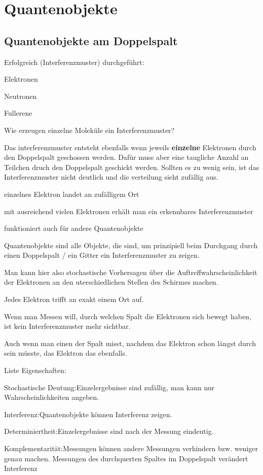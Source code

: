 \chapter{Quantenobjekte}


\section{Quantenobjekte am Doppelspalt}

Erfolgreich (Interferenzmuster) durchgeführt:

\startitemize[packed]
\item Elektronen
\item Neutronen
\item Fullerene
\stopitemize


\startframedtask
Wie erzeugen einzelne Moleküle ein Interferenzmuster?
\stopframedtask

Das interferenzmuster entsteht ebenfalls wenn jeweils {\bf einzelne} Elektronen
durch den Doppelspalt geschossen werden. Dafür muss aber eine taugliche Anzahl
an Teilchen druch den Doppelspalt geschickt werden. Sollten es zu wenig sein,
ist das Interferenzmuster nicht deutlich und die verteilung sieht zufällig aus.

\startitemize[packed]
\item einzelnes Elektron landet an zufälligem Ort
\item mit ausreichend vielen Elektronen erhält man ein erkennbares Interferenzmuster 
\item funktioniert auch für andere Quantenobjekte
\stopitemize

\startdefinition[title={Quantenobjekte}]

Quantenobjekte sind alle Objekte, die  sind, um
prinzipiell beim Durchgang durch einen Doppelspalt / ein Gitter ein
Interferenzmuster zu zeigen.

\stopdefinition

Man kann hier also stochastische Vorhersagen über die Auftreffwahrscheinlichkeit der Elektronen an den uterschiedlichen Stellen des Schirmes machen.

Jedes Elektron trifft an exakt einem Ort auf.

Wenn man Messen will, durch welchen Spalt die Elektronen sich bewegt haben, ist
kein Interferenzmuster mehr sichtbar.

Auch wenn man einen der Spalt misst, nachdem das Elektron schon längst durch
sein müsste,  das Elektron das ebenfalls.

Liste Eigenschaften:

\startitemize[packed,m]
\item Stochastische Deutung:\crlf Einzelergebnisse sind zufällig, man kann nur Wahrscheinlichkeiten angeben.
\item Interferenz:\crlf Quantenobjekte können Interferenz zeigen.
\item Determiniertheit:\crlf Einzelergebnisse sind nach der Messung eindeutig.
\item Komplementarität:\crlf Messungen können andere Messungen verhindern bzw. weniger genau machen. Messungen des durchquerten Spaltes im Doppelspalt verändert Interferenz
\stopitemize
